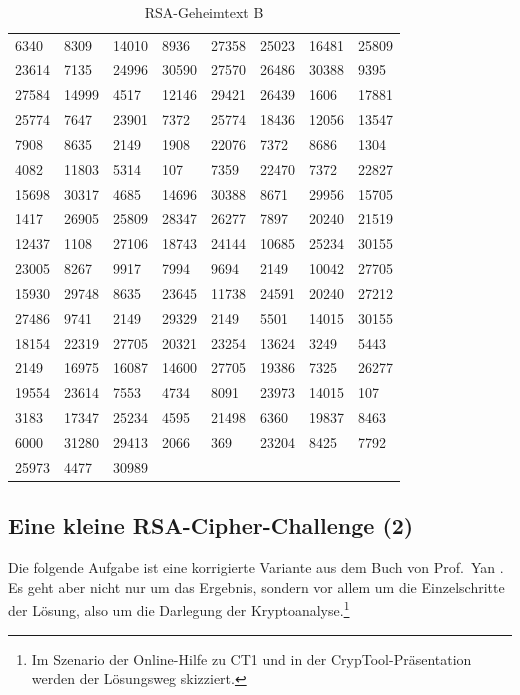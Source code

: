 \begin{refsegment}
\begin{table}[ht]
{\tt
\begin{tabular}{llllllll}
 6340  & 8309 & 14010  & 8936 & 27358 & 25023 & 16481 & 25809\\
23614  & 7135 & 24996 & 30590 & 27570 & 26486 & 30388  & 9395\\
27584 & 14999  & 4517 & 12146 & 29421 & 26439  & 1606 & 17881\\
25774  & 7647 & 23901  & 7372 & 25774 & 18436 & 12056 & 13547\\
 7908  & 8635  & 2149  & 1908 & 22076  & 7372  & 8686  & 1304\\
 4082 & 11803  & 5314   & 107  & 7359 & 22470  & 7372 & 22827\\
15698 & 30317  & 4685 & 14696 & 30388  & 8671 & 29956 & 15705\\
 1417 & 26905 & 25809 & 28347 & 26277  & 7897 & 20240 & 21519\\
12437  & 1108 & 27106 & 18743 & 24144 & 10685 & 25234 & 30155\\
23005  & 8267  & 9917  & 7994  & 9694  & 2149 & 10042 & 27705\\
15930 & 29748  & 8635 & 23645 & 11738 & 24591 & 20240 & 27212\\
27486  & 9741  & 2149 & 29329  & 2149  & 5501 & 14015 & 30155\\
18154 & 22319 & 27705 & 20321 & 23254 & 13624  & 3249  & 5443\\
 2149 & 16975 & 16087 & 14600 & 27705 & 19386  & 7325 & 26277\\
19554 & 23614  & 7553  & 4734  & 8091 & 23973 & 14015   & 107\\
 3183 & 17347 & 25234  & 4595 & 21498  & 6360 & 19837  & 8463\\
 6000 & 31280 & 29413  & 2066   & 369 & 23204  & 8425  & 7792\\
25973  & 4477 & 30989
\end{tabular} } %
\caption{RSA-Geheimtext B}
\label{stinson2}
\end{table}


\clearpage
\subsection{Eine kleine RSA-Cipher-Challenge (2)}

Die folgende Aufgabe ist eine korrigierte Variante aus dem Buch
von Prof.~Yan \cite[Example 3.3.7, S. 318]{Yan2000}. 
Es geht aber nicht nur um das Ergebnis, sondern vor allem um die
Einzelschritte der Lösung, also um die Darlegung der
Kryptoanalyse.\footnote{%
  Im Szenario der Online-Hilfe zu CT1 und in der
  CrypTool-Präsentation werden der Lösungsweg skizziert.
}


\end{refsegment}
